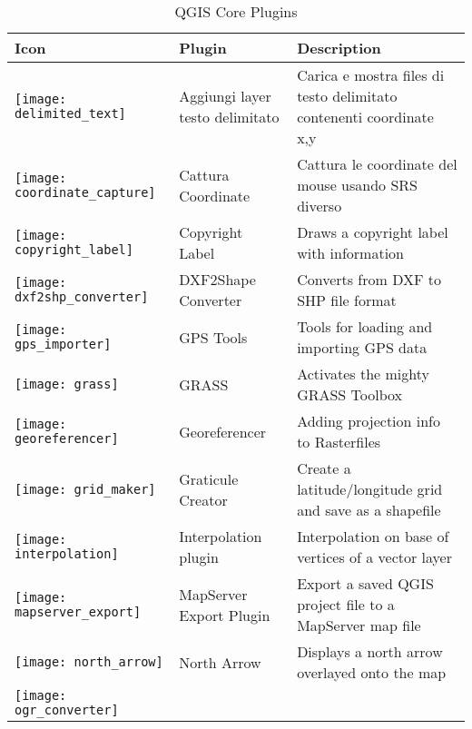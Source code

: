 \begin{minipage}{\textwidth}
\begin{table}[H]
\centering
\caption{QGIS Core Plugins}\label{tab:core_plugins}\medskip
\small
 \begin{tabular}{|l|l|p{4in}|}
\hline \textbf{Icon} & \textbf{Plugin} & \textbf{Description}\\
\hline
\texttt{[image: delimited\_text]}
 & Aggiungi layer testo delimitato \index{plugins!delimited text} & Carica e mostra files di testo delimitato contenenti coordinate x,y\\
\hline
\texttt{[image: coordinate\_capture]}
 & Cattura Coordinate \index{plugins!coordinate capture}& Cattura le coordinate del mouse
usando SRS diverso\\
\hline 
\texttt{[image: copyright\_label]}
 & Copyright Label \index{plugins!copyright}& Draws a copyright label with
information\\
\hline 
\texttt{[image: dxf2shp\_converter]}
 & DXF2Shape Converter \index{plugins!DXF2Shape}& Converts from DXF to SHP file
format\\
\hline
\texttt{[image: gps\_importer]}
 & GPS Tools \index{plugins!gps}& Tools for loading and importing GPS data\\
\hline
\texttt{[image: grass]}
 & GRASS \index{plugin!grass toolbox} & Activates the mighty GRASS Toolbox\\
\hline
\texttt{[image: georeferencer]}
 & Georeferencer \index{plugin!georeferencer} & Adding projection info to
Rasterfiles\\
\hline
\texttt{[image: grid\_maker]}
 & Graticule Creator \index{plugins!graticule}& Create a latitude/longitude grid
and save as a shapefile\\
\hline
\texttt{[image: interpolation]}
& Interpolation plugin \index{plugins!Interpolation}& Interpolation on base of
vertices of a vector layer\\
\hline
\texttt{[image: mapserver\_export]}
& MapServer Export Plugin \index{plugins!MapServer Export}& Export a saved QGIS
project file to a MapServer map file \\
\hline
\texttt{[image: north\_arrow]}
& North Arrow \index{plugins!north arrow}& Displays a north arrow overlayed onto
the map\\
\hline
\texttt{[image: ogr\_converter]}

\end{tabular}
\end{table}
\end{minipage}
